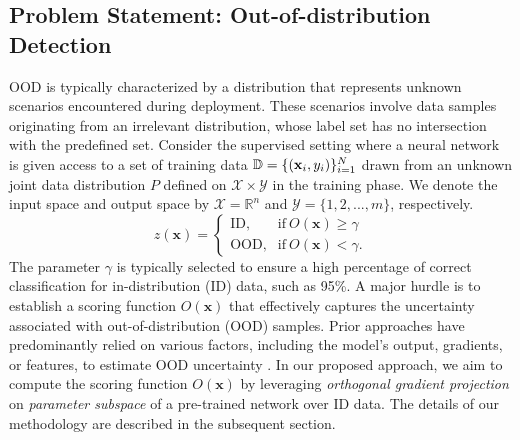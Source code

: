 \documentclass{article}
\begin{document}
\subsection{Problem Statement: Out-of-distribution Detection}\label{sec:problem-statement}\vspace{-3mm}
OOD is typically characterized by a distribution that represents unknown scenarios encountered during deployment. These scenarios involve data samples originating from an irrelevant distribution, whose label set has no intersection with the predefined set. Consider the supervised setting where a neural network is given access to a set of training data ${\mathbb{D}}=\{(\mathbf{x}_i,y_i)\}_{i=1}^N$ drawn from an unknown joint data distribution $P$ defined on $\mathcal{X}\times \mathcal{Y}$ in the training phase. We denote the input space and output space by $\mathcal{X}=\mathbb{R}^n$ and $\mathcal{Y}=\{1,2,..., m \}$, respectively. 
\begin{equation}
    z(\mathbf{x}) = 
    \begin{cases}
    \text{ID}, &\text{if}\ O(\mathbf{x}) \geq \gamma \\
    \text{OOD}, &\text{if}\ O(\mathbf{x}) < \gamma.
    \label{oodness}
    \end{cases}
\end{equation}
  The parameter $\gamma$ is typically selected to ensure a high percentage of correct classification for in-distribution (ID) data, such as 95\%. A major hurdle is to establish a scoring function $O(\mathbf{x})$ that effectively captures the uncertainty associated with out-of-distribution (OOD) samples. Prior approaches have predominantly relied on various factors, including the model's output, gradients, or features, to estimate OOD uncertainty \cite{huang2021importance,djurisic2022extremely}. In our proposed approach, we aim to compute the scoring function $O(\mathbf{x})$ by leveraging  \textit{orthogonal gradient projection} on \textit{ parameter subspace} of a pre-trained network over ID data. The details of our methodology are described in the subsequent section.
\vspace{-0.2cm}
\end{document}
